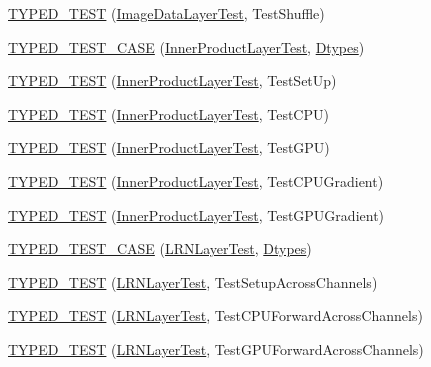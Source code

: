 \begin{DoxyCompactItemize}
\item 
\hyperlink{namespacecaffe_acf93a8a93d356c1c250d3b516579fcd1}{T\+Y\+P\+E\+D\+\_\+\+T\+E\+S\+T} (\hyperlink{classcaffe_1_1_image_data_layer_test}{Image\+Data\+Layer\+Test}, Test\+Shuffle)
\item 
\hyperlink{namespacecaffe_acf9f31f61aa14e63a227ee95fd86fe15}{T\+Y\+P\+E\+D\+\_\+\+T\+E\+S\+T\+\_\+\+C\+A\+S\+E} (\hyperlink{classcaffe_1_1_inner_product_layer_test}{Inner\+Product\+Layer\+Test}, \hyperlink{namespacecaffe_a131dc2be50f2f10e18450da61cde6b57}{Dtypes})
\item 
\hyperlink{namespacecaffe_ad24f9934dfa0e840cb0f30e0be2b059c}{T\+Y\+P\+E\+D\+\_\+\+T\+E\+S\+T} (\hyperlink{classcaffe_1_1_inner_product_layer_test}{Inner\+Product\+Layer\+Test}, Test\+Set\+Up)
\item 
\hyperlink{namespacecaffe_a47e91d8cc48b3e09838040ca5921d500}{T\+Y\+P\+E\+D\+\_\+\+T\+E\+S\+T} (\hyperlink{classcaffe_1_1_inner_product_layer_test}{Inner\+Product\+Layer\+Test}, Test\+C\+P\+U)
\item 
\hyperlink{namespacecaffe_a0c6a32692d9ce28a6ca32d7d0f7af641}{T\+Y\+P\+E\+D\+\_\+\+T\+E\+S\+T} (\hyperlink{classcaffe_1_1_inner_product_layer_test}{Inner\+Product\+Layer\+Test}, Test\+G\+P\+U)
\item 
\hyperlink{namespacecaffe_a2ffe3d654cf9ce337bf4cbcfc351eecc}{T\+Y\+P\+E\+D\+\_\+\+T\+E\+S\+T} (\hyperlink{classcaffe_1_1_inner_product_layer_test}{Inner\+Product\+Layer\+Test}, Test\+C\+P\+U\+Gradient)
\item 
\hyperlink{namespacecaffe_a77456bf969bf1c22829a07928b2fe38b}{T\+Y\+P\+E\+D\+\_\+\+T\+E\+S\+T} (\hyperlink{classcaffe_1_1_inner_product_layer_test}{Inner\+Product\+Layer\+Test}, Test\+G\+P\+U\+Gradient)
\item 
\hyperlink{namespacecaffe_abbf618c603525984c900126a2edffdfb}{T\+Y\+P\+E\+D\+\_\+\+T\+E\+S\+T\+\_\+\+C\+A\+S\+E} (\hyperlink{classcaffe_1_1_l_r_n_layer_test}{L\+R\+N\+Layer\+Test}, \hyperlink{namespacecaffe_a131dc2be50f2f10e18450da61cde6b57}{Dtypes})
\item 
\hyperlink{namespacecaffe_afa697facebb8ba8af1f6b66283e46855}{T\+Y\+P\+E\+D\+\_\+\+T\+E\+S\+T} (\hyperlink{classcaffe_1_1_l_r_n_layer_test}{L\+R\+N\+Layer\+Test}, Test\+Setup\+Across\+Channels)
\item 
\hyperlink{namespacecaffe_ad8a198f0fc897bcd22743c0ff5fc637d}{T\+Y\+P\+E\+D\+\_\+\+T\+E\+S\+T} (\hyperlink{classcaffe_1_1_l_r_n_layer_test}{L\+R\+N\+Layer\+Test}, Test\+C\+P\+U\+Forward\+Across\+Channels)
\item 
\hyperlink{namespacecaffe_a6798babe07ab27907cd346e48f6da9ea}{T\+Y\+P\+E\+D\+\_\+\+T\+E\+S\+T} (\hyperlink{classcaffe_1_1_l_r_n_layer_test}{L\+R\+N\+Layer\+Test}, Test\+G\+P\+U\+Forward\+Across\+Channels)

\end{DoxyCompactItemize}

